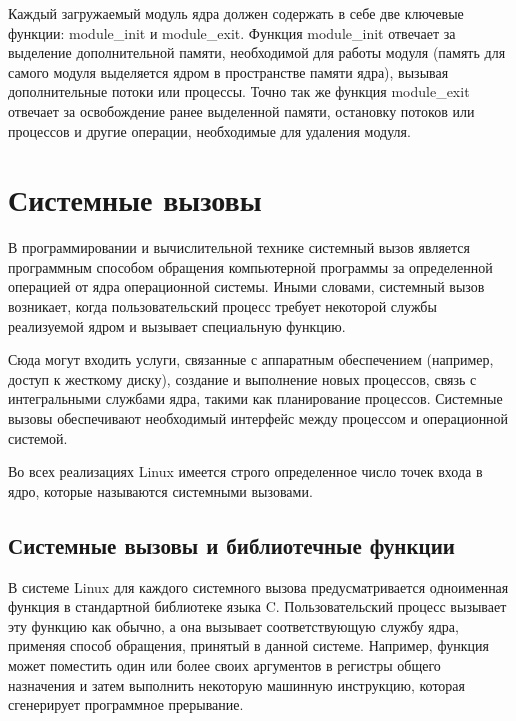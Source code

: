 Каждый загружаемый модуль ядра должен содержать в себе две ключевые функции: module\_init и module\_exit. Функция module\_init отвечает за выделение дополнительной памяти, необходимой для работы модуля (память для самого модуля выделяется ядром в пространстве памяти ядра), вызывая дополнительные потоки или процессы. Точно так же функция module\_exit отвечает за освобождение ранее выделенной памяти, остановку потоков или процессов и другие операции, необходимые для удаления модуля.

\section{Системные вызовы}%
\label{sec:sistemnye_vyzovy}

В программировании и вычислительной технике системный вызов является программным способом обращения компьютерной программы за определенной операцией от ядра операционной системы. Иными словами, системный вызов возникает, когда пользовательский процесс требует некоторой службы реализуемой ядром и вызывает специальную функцию.

Сюда могут входить услуги, связанные с аппаратным обеспечением (например, доступ к жесткому диску), создание и выполнение новых процессов, связь с интегральными службами ядра, такими как планирование процессов. Системные вызовы обеспечивают необходимый интерфейс между процессом и операционной системой.

Во всех реализациях Linux имеется строго определенное число точек входа в ядро, которые называются системными вызовами.

\subsection{Системные вызовы и библиотечные функции}%
\label{sub:promezhutochnaia_biblioteka}

В системе Linux для каждого системного вызова предусматривается одноименная функция в стандартной библиотеке языка C. Пользовательский процесс вызывает эту функцию как обычно, а она вызывает соответствующую службу ядра,
применяя способ обращения, принятый в данной системе. Например, функция
может поместить один или более своих аргументов в регистры общего назначения и затем выполнить некоторую машинную инструкцию, которая сгенерирует
программное прерывание.


